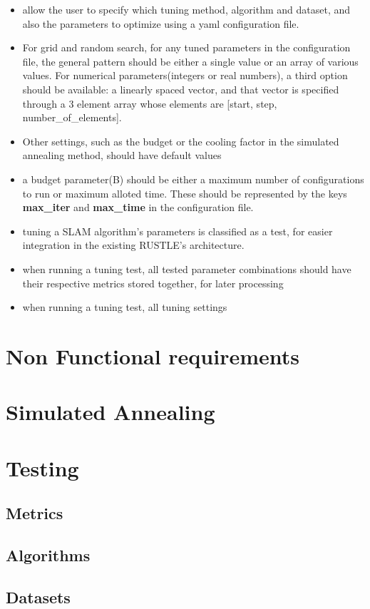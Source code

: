 \begin{itemize}
	\item allow the user to specify which tuning method, algorithm and dataset, and also the parameters to optimize using a yaml configuration file.
	\item For grid and random search, for any tuned parameters in the configuration file, the general pattern should be either a single value or an array of various values. For numerical parameters(integers or real numbers), a third option should be available: a linearly spaced vector, and that vector is specified through a 3 element array whose elements are [start, step, number\_of\_elements].
	\item Other settings, such as the budget or the cooling factor in the simulated annealing method, should have default values
	\item a budget parameter(B) should be either a maximum number of configurations to run or maximum alloted time. These should be represented by the keys \textbf{max\_iter} and \textbf{max\_time} in the configuration file.
	\item tuning a SLAM algorithm's parameters is classified as a test, for easier integration in the existing RUSTLE's architecture.
	\item when running a tuning test, all tested parameter combinations should have their respective metrics stored together, for later processing
	\item when running a tuning test, all tuning settings
\end{itemize}

\section{Non Functional requirements}

\section{Simulated Annealing}

\section{Testing}

\subsection{Metrics}

\subsection{Algorithms}

\subsection{Datasets}